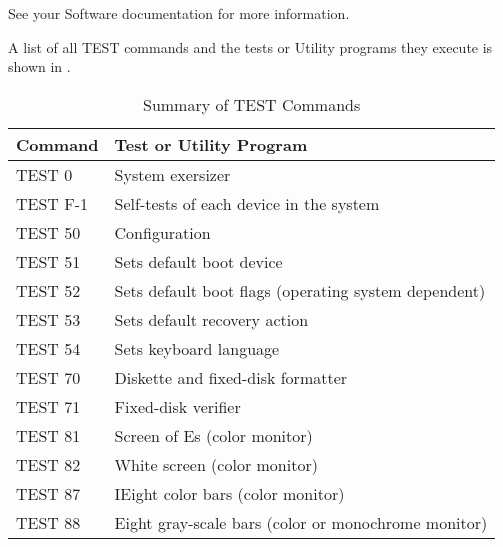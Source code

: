 \documentclass{dec}
\begin{document}
See your Software documentation for more information.


A list of all TEST commands and the tests or Utility programs they execute
is shown in .

\begin{table}[H]
\caption{Summary of TEST Commands}
\label{table:3}
\begin{tabularx}{\textwidth}{l l}
\hline
\textbf{Command} & \textbf{Test or Utility Program}\\
\hline
TEST 0 & System exersizer \\
TEST F-1 & Self-tests of each device in the system \\
TEST 50 & Configuration \\
TEST 51 & Sets default boot device \\
TEST 52 & Sets default boot flags (operating system dependent) \\
TEST 53 & Sets default recovery action \\
TEST 54 & Sets keyboard language \\
TEST 70 & Diskette and fixed-disk formatter \\
TEST 71 & Fixed-disk verifier \\
TEST 81 & Screen of Es (color monitor) \\
TEST 82 & White screen (color monitor) \\
TEST 87 & IEight color bars (color monitor) \\
TEST 88 & Eight gray-scale bars (color or monochrome monitor) \\
\end{tabularx}
\end{table}


\howtoorder
\end{document}
